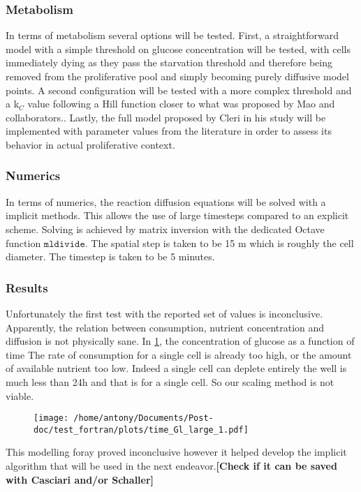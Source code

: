 \documentclass[11pt,a4paper]{article}
\begin{document}
\subsubsection{Metabolism}
In terms of metabolism several options will be tested. First, a straightforward model with a simple threshold on glucose concentration will be tested, with cells immediately dying as they pass the starvation threshold and therefore being removed from the proliferative pool and simply becoming purely diffusive model points. A second configuration will be tested with a more complex threshold and a k$_{C}$ value following a Hill function closer to what was proposed by Mao and collaborators.\cite{Mao2018}. Lastly, the full model proposed by Cleri in his study will be implemented with parameter values from the literature in order to assess its behavior in actual proliferative context.

\subsubsection{Numerics}
In terms of numerics, the reaction diffusion equations will be solved with a implicit methods. This allows the use of large timesteps compared to an explicit scheme. Solving is achieved by matrix inversion with the dedicated Octave function $\mathtt{mldivide}$. The spatial step is taken to be 15 \textmu m which is roughly the cell diameter. The timestep is taken to be 5 minutes. 

\subsubsection{Results}
Unfortunately the first test with the reported set of values is inconclusive. Apparently, the relation between consumption, nutrient concentration and diffusion is not physically sane. In \ref{t_1D}, the concentration of glucose as a function of time  The rate of consumption for a single cell is already too high, or the amount of available nutrient too low. Indeed a single cell can deplete entirely the well is much less than 24h and that is for a single cell. So our scaling method is not viable. 

\begin{figure}[ht!]
	\centering
	\texttt{[image: /home/antony/Documents/Post-doc/test\_fortran/plots/time\_Gl\_large\_1.pdf]}
	\caption{\label{t_1D}}
\end{figure}

This modelling foray proved inconclusive however it helped develop the implicit algorithm that will be used in the next endeavor.\textbf{[Check if it can be saved with Casciari and/or Schaller]}
\end{document}
